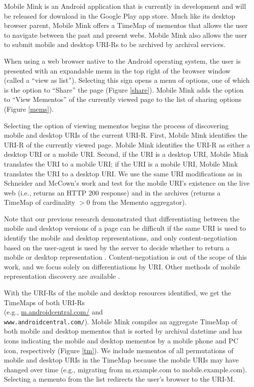 \documentclass{sig-alternate-2013}
\begin{document}
Mobile Mink is an Android application that is currently in development and will be released for download in the Google Play app store.
Much like its desktop browser parent, Mobile Mink offers a TimeMap of mementos that allows the user to navigate between the past and present webs. Mobile Mink also allows the user to submit mobile and desktop URI-Rs to be archived by archival services.

When using a web browser native to the Android operating system, the user is presented with an expandable menu in the top right of the browser window (called a ``view as list''). Selecting this sign opens a menu of options, one of which is the option to ``Share'' the page (Figure \ref{share}). Mobile Mink adds the option to ``View Mementos'' of the currently viewed page to the list of sharing options (Figure \ref{mems}).

Selecting the option of viewing mementos begins the process of discovering mobile and desktop URIs of the current URI-R. First, Mobile Mink identifies the URI-R of the currently viewed page. Mobile Mink identifies the URI-R as either a desktop URI or a mobile URI. Second, if the URI is a desktop URI, Mobile Mink translates the URI to a mobile URI; if the URI is a mobile URI, Mobile Mink translates the URI to a desktop URI. We use the same URI modifications as in Schneider and McCown's work \cite{frankMobile} and test for the mobile URI's existence on the live web (i.e., returns an HTTP 200 response) and in the archives (returns a TimeMap of cardinality $> 0$ from the Memento aggregator).

Note that our previous research demonstrated that differentiating between the mobile and desktop versions of a page can be difficult if the same URI is used to identify the mobile and desktop representations, and only content-negotiation based on the user-agent is used by the server to decide whether to return a mobile or desktop representation \cite{idReps}. Content-negotiation is out of the scope of this work, and we focus solely on differentiations by URI. Other methods of mobile representation discovery are available \cite{frankMobileDlib}.

With the URI-Rs of the mobile and desktop resources identified, we get the TimeMaps of both URI-Rs\\ (e.g., \url{m.androidcentral.com/} and \\\texttt{www.androidcentral.com/}). Mobile Mink compiles an aggregate TimeMap of both mobile and desktop mementos that is sorted by archival datetime and has icons indicating the mobile and desktop mementos by a mobile phone and PC icon, respectively (Figure \ref{tm}). We include mementos of all permutations of mobile and desktop URIs in the TimeMap because the mobile URIs may have changed over time (e.g., migrating from m.example.com to mobile.example.com). Selecting a memento from the list redirects the user's browser to the URI-M.
\end{document}

